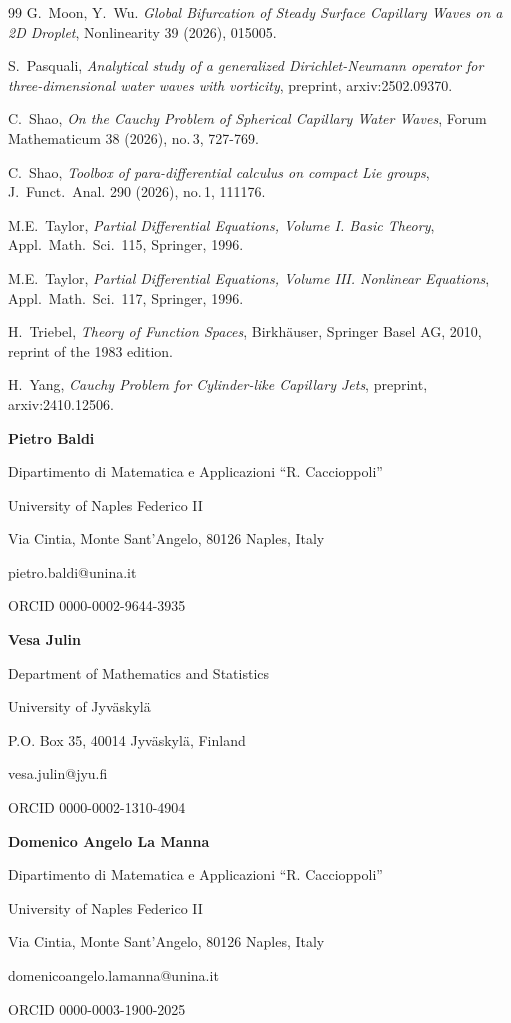 \documentclass[10pt,reqno,a4paper]{article}
\numberwithin{equation}{section}
\theoremstyle{plain}
\theoremstyle{definition}
\begin{document}
\begin{thebibliography}{99}
G.\ Moon, Y.\ Wu.
\emph{Global Bifurcation of Steady Surface Capillary Waves on a 2D Droplet}, 
Nonlinearity 39 (2026), 015005. 

S.\ Pasquali, 
\emph{Analytical study of a generalized Dirichlet-Neumann operator 
for three-dimensional water waves with vorticity},
preprint, arxiv:2502.09370.

C.\ Shao,
\emph {On the Cauchy Problem of Spherical Capillary Water Waves}, 
Forum Mathematicum 38 (2026), no.\,3, 727-769.

C.\ Shao,
\emph{Toolbox of para-differential calculus on compact Lie groups},
J.\ Funct.\ Anal. 290 (2026), no.\,1, 111176.

M.E.\ Taylor,
\emph{Partial Differential Equations, Volume I. Basic Theory}, 
Appl.\ Math.\ Sci.\ 115, Springer, 1996. 

M.E.\ Taylor,
\emph{Partial Differential Equations, Volume III. Nonlinear Equations}, 
Appl.\ Math.\ Sci.\ 117, Springer, 1996. 

H.\ Triebel, 
\emph{Theory of Function Spaces}, 
Birkh\"auser, Springer Basel AG, 2010, reprint of the 1983 edition.

H.\ Yang, 
\emph{Cauchy Problem for Cylinder-like Capillary Jets},
preprint, arxiv:2410.12506.

\end{thebibliography}


\bigskip

\bigskip


\begin{flushright}

\textbf{Pietro Baldi}

Dipartimento di Matematica e Applicazioni ``R. Caccioppoli''

University of Naples Federico II

Via Cintia, Monte Sant'Angelo, 80126 Naples, Italy

pietro.baldi@unina.it

ORCID 0000-0002-9644-3935

\medskip

\textbf{Vesa Julin} 

Department of Mathematics and Statistics

University of Jyv\"askyl\"a

P.O. Box 35, 40014 Jyv\"askyl\"a, Finland

vesa.julin@jyu.fi

ORCID 0000-0002-1310-4904

\medskip

\textbf{Domenico Angelo La Manna}

Dipartimento di Matematica e Applicazioni ``R. Caccioppoli''

University of Naples Federico II

Via Cintia, Monte Sant'Angelo, 80126 Naples, Italy

domenicoangelo.lamanna@unina.it

ORCID 0000-0003-1900-2025

\end{flushright}
\end{document}
